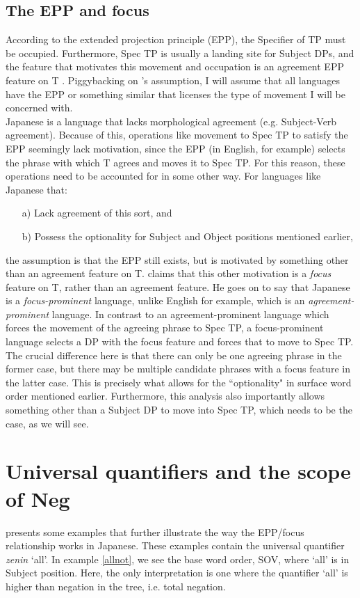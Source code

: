 \documentclass{article}
\begin{document}
\subsection{The EPP and focus}
According to the extended projection principle (EPP), the Specifier of TP must be occupied. Furthermore, Spec TP is usually a landing site for Subject DPs, and the feature that motivates this movement and  occupation is an agreement EPP feature on T \citep[p. 216]{Adger2003}. Piggybacking on \cite{Miyagawa2005}'s assumption, I will assume that all languages have the EPP or something similar that licenses the type of  movement I will be concerned with. \\

Japanese is a language that lacks morphological agreement (e.g. Subject-Verb agreement). Because of this, operations like movement to Spec TP to satisfy the EPP seemingly lack motivation, since the EPP (in English, for example) selects the phrase with which T agrees and moves it to Spec TP. For this reason, these operations need to be accounted for in some other way. For languages like Japanese that:

\begin{itemize}
    \item [a)] Lack agreement of this sort, and
    \item [b)] Possess the optionality for Subject and Object positions mentioned earlier,
\end{itemize}
the assumption is that the EPP still exists, but is motivated by something other than an agreement feature on T. \cite{Miyagawa2005} claims that this other motivation is a \textit{focus} feature on T, rather than an agreement feature. He goes on to say that Japanese is a \textit{focus-prominent} language, unlike English for example, which is an \textit{agreement-prominent} language. In contrast to an agreement-prominent language which forces the movement of the agreeing phrase to Spec TP, a focus-prominent language selects a DP with the focus feature and forces that to move to Spec TP. The crucial difference here is that there can only be one agreeing phrase in the former case, but there may be multiple candidate phrases with a focus feature in the latter case. This is precisely what allows for the “optionality" in surface word order mentioned earlier. Furthermore, this analysis also importantly allows something other than a Subject DP to move into Spec TP, which needs to be the case, as we will see.

\section{Universal quantifiers and the scope of Neg}
\label{negscope}
\cite{Miyagawa2001} presents some examples that further illustrate the way the EPP/focus relationship works in Japanese. These examples contain the universal quantifier \textit{zenin} ‘all'. In example \ref{allnot}, we see the base word order, SOV, where `all' is in Subject position. Here, the only interpretation is one where the quantifier `all' is higher than negation in the tree, i.e. total negation.
\end{document}
